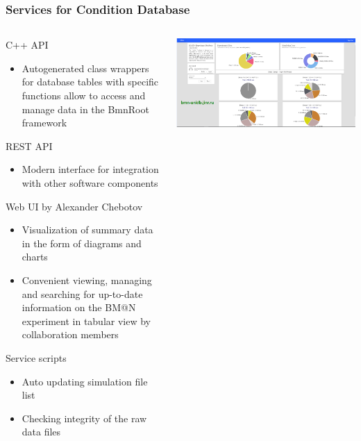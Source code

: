 \documentclass[8pt,pdf,hyperref={unicode}]{beamer}
\begin{document}
\begin{frame}
	\frametitle{Services for Condition Database}
	\begin{columns}
		\begin{column}{0.5\linewidth}
			C++ API
			\begin{itemize}
				\item Autogenerated class wrappers for database tables with specific functions allow to access and manage data in the BmnRoot framework
			\end{itemize}
			REST API
			\begin{itemize}
				\item Modern interface for integration with other software components
			\end{itemize}
			Web UI by Alexander Chebotov
			\begin{itemize}
				\item Visualization of summary data in the form of diagrams and charts
				\item Convenient viewing, managing and searching for up-to-date information on the BM@N experiment in tabular view by collaboration members
			\end{itemize}
			Service scripts
			\begin{itemize}
				\item Auto updating simulation file list
				\item Checking integrity of the raw data files
			\end{itemize}
		\end{column}
		\begin{column}{0.5\linewidth}
			\includegraphics[width=\linewidth]{image/slide4.png}
		\end{column}
	\end{columns}
\end{frame}
\end{document}
